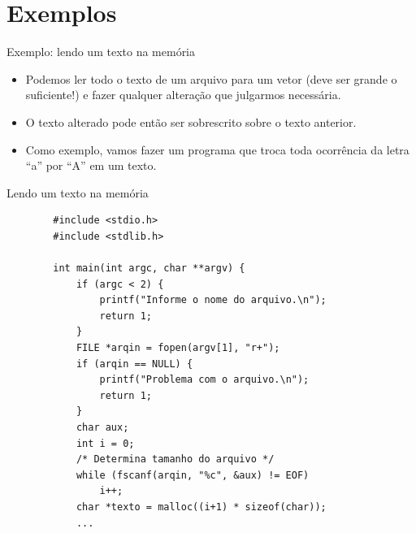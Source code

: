 \documentclass[handout]{beamer}
\begin{document}
\section{Exemplos}

\begin{frame}[fragile]{Exemplo: lendo um texto na memória}

    \begin{itemize}
        \item Podemos ler todo o texto de um arquivo para um vetor (deve ser grande
        o suficiente!) e fazer qualquer alteração que julgarmos necessária.
        \item O texto alterado pode então ser sobrescrito sobre o texto anterior.
        \item Como exemplo, vamos fazer um programa que troca toda ocorrência
        da letra ``a'' por ``A'' em um texto.
    \end{itemize}

\end{frame}

\begin{frame}[fragile]{Lendo um texto na memória}

    \begin{verbatim}
        #include <stdio.h>
        #include <stdlib.h>

        int main(int argc, char **argv) {
            if (argc < 2) {
                printf("Informe o nome do arquivo.\n");
                return 1;
            }
            FILE *arqin = fopen(argv[1], "r+");
            if (arqin == NULL) {
                printf("Problema com o arquivo.\n");
                return 1;
            }
            char aux;
            int i = 0;
            /* Determina tamanho do arquivo */
            while (fscanf(arqin, "%c", &aux) != EOF)
                i++;
            char *texto = malloc((i+1) * sizeof(char));
            ...
    \end{verbatim}

\end{frame}
\end{document}

